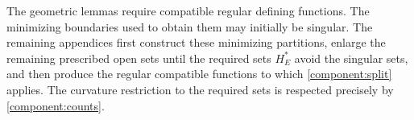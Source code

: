 The geometric lemmas require compatible regular defining functions.
The minimizing boundaries used to obtain them may initially be
singular.  The remaining appendices first construct these minimizing
partitions, enlarge the remaining prescribed open sets until the required sets $H_E^*$
avoid the singular sets, and then produce the regular compatible functions to which
\cref{component:split} applies.  The curvature restriction to the required
sets is respected precisely by \cref{component:counts}.

